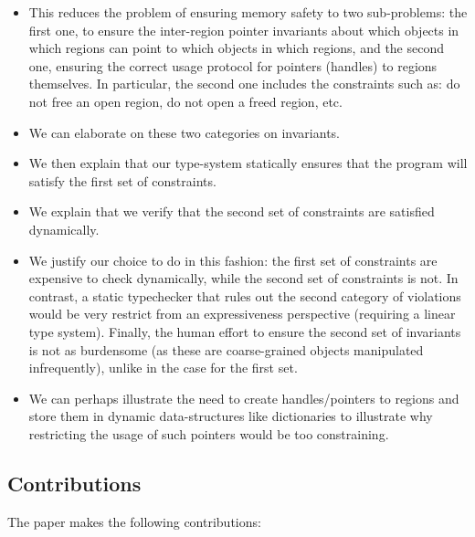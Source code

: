\begin{itemize}
\item
This reduces the problem of ensuring memory safety to two sub-problems: the first one, to ensure the inter-region pointer invariants about which objects in which regions can point to which objects in which regions, and the second one, ensuring the correct usage protocol for pointers (handles) to regions themselves. In particular, the second one includes the constraints such as: do not free an open region, do not open a freed region, etc.

\item
We can elaborate on these two categories on invariants.

\item
We then explain that our type-system statically ensures that the program will satisfy the first set of constraints.

\item
We explain that we verify that the second set of constraints are satisfied dynamically.

\item
We justify our choice to do in this fashion: the first set of constraints are expensive to check dynamically, while the second set of constraints is not. In contrast, a static typechecker that rules out the second category of violations would be very restrict from an expressiveness perspective (requiring a linear type system). Finally, the human effort to ensure the second set of invariants is not as burdensome (as these are coarse-grained objects manipulated infrequently), unlike in the case for the first set.

\item
We can perhaps illustrate the need to create handles/pointers to regions and store them in dynamic data-structures like dictionaries to illustrate why restricting the usage of such pointers would be too constraining.

\end{itemize}

\subsection*{Contributions}

The paper makes the following contributions:

